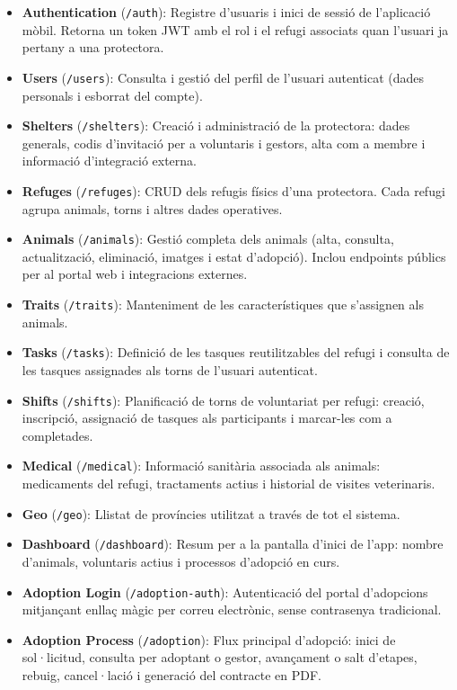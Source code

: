\documentclass[11pt,a4paper]{report}
\begin{document}
\begin{itemize}
    \item \textbf{Authentication} (\texttt{/auth}): Registre d'usuaris i inici de sessió de l'aplicació mòbil. Retorna un token JWT amb el rol i el refugi associats quan l'usuari ja pertany a una protectora.
    \item \textbf{Users} (\texttt{/users}): Consulta i gestió del perfil de l'usuari autenticat (dades personals i esborrat del compte).
    \item \textbf{Shelters} (\texttt{/shelters}): Creació i administració de la protectora: dades generals, codis d'invitació per a voluntaris i gestors, alta com a membre i informació d'integració externa.
    \item \textbf{Refuges} (\texttt{/refuges}): CRUD dels refugis físics d'una protectora. Cada refugi agrupa animals, torns i altres dades operatives.
    \item \textbf{Animals} (\texttt{/animals}): Gestió completa dels animals (alta, consulta, actualització, eliminació, imatges i estat d'adopció). Inclou endpoints públics per al portal web i integracions externes.
    \item \textbf{Traits} (\texttt{/traits}): Manteniment de les característiques que s'assignen als animals.
    \item \textbf{Tasks} (\texttt{/tasks}): Definició de les tasques reutilitzables del refugi i consulta de les tasques assignades als torns de l'usuari autenticat.
    \item \textbf{Shifts} (\texttt{/shifts}): Planificació de torns de voluntariat per refugi: creació, inscripció, assignació de tasques als participants i marcar-les com a completades.
    \item \textbf{Medical} (\texttt{/medical}): Informació sanitària associada als animals: medicaments del refugi, tractaments actius i historial de visites veterinaris.
    \item \textbf{Geo} (\texttt{/geo}): Llistat de províncies utilitzat a través de tot el sistema.
    \item \textbf{Dashboard} (\texttt{/dashboard}): Resum per a la pantalla d'inici de l'app: nombre d'animals, voluntaris actius i processos d'adopció en curs.
    \item \textbf{Adoption Login} (\texttt{/adoption-auth}): Autenticació del portal d'adopcions mitjançant enllaç màgic per correu electrònic, sense contrasenya tradicional.
    \item \textbf{Adoption Process} (\texttt{/adoption}): Flux principal d'adopció: inici de sol·licitud, consulta per adoptant o gestor, avançament o salt d'etapes, rebuig, cancel·lació i generació del contracte en PDF.

\end{itemize}
\end{document}
